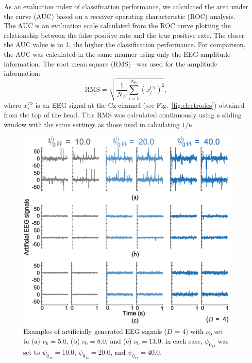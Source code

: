 \documentclass[journal]{IEEEtran}
\begin{document}
As an evaluation index of classification performance, we calculated the area under the curve (AUC) based on a receiver operating characteristic (ROC) analysis.
The AUC is an evaluation scale calculated from the ROC curve plotting the relationship between the false positive rate and the true positive rate.
The closer the AUC value is to 1, the higher the classification performance.
For comparison, the AUC was calculated in the same manner using only the EEG amplitude information.
The root mean square (RMS)~\cite{Hamedi2014} was used for the amplitude information:
%
\begin{equation}%
		\mathrm{RMS} = \sqrt{\frac{1}{N_W} \sum_{i=1}^{N_W} (x_i^\mathrm{Cz})^2},
\end{equation}
%
where $x_i^\mathrm{Cz}$ is an EEG signal at the Cz channel (see Fig.~\ref{fig:electrodes}) obtained from the top of the head.
This RMS was calculated continuously using a sliding window with the same settings as those used in calculating $1/\nu$.

\begin{figure}[t]
\centering
\includegraphics[width=1.0\hsize]{figure/simulation_EEG_4.eps}
\caption{Examples of artificially generated EEG signals ($D$ = 4) with $\nu_0$ set to (a) $\nu_0 = 5.0$, (b) $\nu_0 = 8.0$, and (c) $\nu_0 = 13.0$; in each case, ${{\psi_0}_{ii}}$ was set to ${{\psi_0}_{ii}} = 10.0$, ${{\psi_0}_{ii}} = 20.0$, and ${{\psi_0}_{ii}} = 40.0$.}
\label{fig:sim_EEG}
\end{figure}
\end{document}
